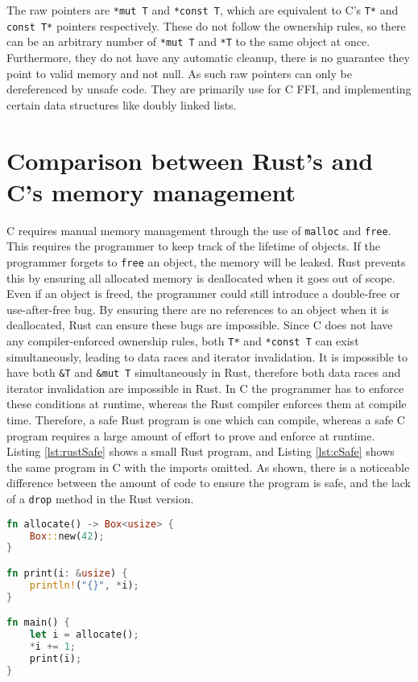 \documentclass[10pt,a4paper,twocolumn]{article}
\begin{document}
The raw pointers are \lstinline{*mut T} and \lstinline{*const T}, which are equivalent to C's
\lstinline{T*} and \lstinline{const T*} pointers respectively.
These do not follow the ownership rules, so there can be an arbitrary number of \lstinline{*mut T}
and \lstinline{*T} to the same object at once.
Furthermore, they do not have any automatic cleanup, there is no guarantee they point to valid
memory and not null.
As such raw pointers can only be dereferenced by unsafe code.
They are primarily use for C FFI, and implementing certain data structures like doubly linked lists.

\section{Comparison between Rust's and C's memory management}
C requires manual memory management through the use of \lstinline{malloc} and \lstinline{free}.
This requires the programmer to keep track of the lifetime of objects.
If the programmer forgets to \lstinline{free} an object, the memory will be leaked.
Rust prevents this by ensuring all allocated memory is deallocated when it goes out of scope.
Even if an object is freed, the programmer could still introduce a double-free or use-after-free
bug.
By ensuring there are no references to an object when it is deallocated, Rust can ensure these bugs
are impossible.
Since C does not have any compiler-enforced ownership rules, both \lstinline{T*} and
\lstinline{*const T} can exist simultaneously, leading to data races and iterator invalidation.
It is impossible to have both \lstinline{&T} and \lstinline{&mut T} simultaneously in Rust,
therefore both data races and iterator invalidation are impossible in Rust.
In C the programmer has to enforce these conditions at runtime, whereas the Rust compiler enforces
them at compile time.
Therefore, a safe Rust program is one which can compile, whereas a safe C program requires a large
amount of effort to prove and enforce at runtime.
Listing \ref{lst:rustSafe} shows a small Rust program, and Listing \ref{lst:cSafe} shows the same
program in C with the imports omitted.
As shown, there is a noticeable difference between the amount of code to ensure the program is
safe, and the lack of a \lstinline{drop} method in the Rust version.

\begin{lstlisting}[language=Rust, float=h, label=lst:rustSafe, caption={A short safe Rust program
	to allocate, increment, print and deallocate an integer.}]
fn allocate() -> Box<usize> {
	Box::new(42);
}

fn print(i: &usize) {
	println!("{}", *i);
}

fn main() {
	let i = allocate();
	*i += 1;
	print(i);
}
\end{lstlisting}
\end{document}
